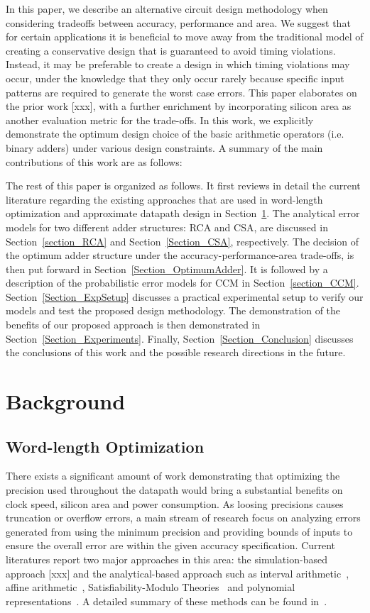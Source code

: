 \documentclass[journal]{IEEEtran}
\begin{document}
In this paper, we describe an alternative circuit design methodology when considering tradeoffs between accuracy, performance and area. We suggest that for certain applications it is beneficial to move away from the traditional model of creating a conservative design that is guaranteed to avoid timing violations. Instead, it may be preferable to create a design in which timing violations may occur, under the knowledge that they only occur rarely because specific input patterns are required to generate the worst case errors. This paper elaborates on the prior work [xxx], with a further enrichment by incorporating silicon area as another evaluation metric for the trade-offs. In this work, we explicitly demonstrate the optimum design choice of the basic arithmetic operators (i.e. binary adders) under various design constraints. A summary of the main contributions of this work are as follows:

The rest of this paper is organized as follows. It first reviews in detail the current literature regarding the existing approaches that are used in word-length optimization and approximate datapath design in Section~\ref{Section_Background}. The analytical error models for two different adder structures: RCA and CSA, are discussed in Section~\ref{section_RCA} and Section~\ref{Section_CSA}, respectively. The decision of the optimum adder structure under the accuracy-performance-area trade-offs, is then put forward in Section~\ref{Section_OptimumAdder}. It is followed by a description of the probabilistic error models for CCM in Section~\ref{section_CCM}. Section~\ref{Section_ExpSetup} discusses a practical experimental setup to verify our models and test the proposed design methodology. The demonstration of the benefits of our proposed approach is then demonstrated in Section~\ref{Section_Experiments}. Finally, Section~\ref{Section_Conclusion} discusses the conclusions of this work and the possible research directions in the future.

\section{Background}\label{Section_Background}
\subsection{Word-length Optimization}\label{Section_Background_WL}
There exists a significant amount of work demonstrating that optimizing the precision used throughout the datapath would bring a substantial benefits on clock speed, silicon area and power consumption. As loosing precisions causes truncation or overflow errors, a main stream of research focus on analyzing errors generated from using the minimum precision and providing bounds of inputs to ensure the overall error are within the given accuracy specification. Current literatures report two major approaches in this area: the simulation-based approach [xxx] and the analytical-based approach such as interval arithmetic~\cite{moore1966IA}, affine arithmetic~\cite{de2004affine}, Satisfiability-Modulo Theories~\cite{SAT2010} and polynomial representations~\cite{Boland2011TCAD}. A detailed summary of these methods can be found in~\cite{GeorgeDT11, lee2006accuracy}.
\end{document}
